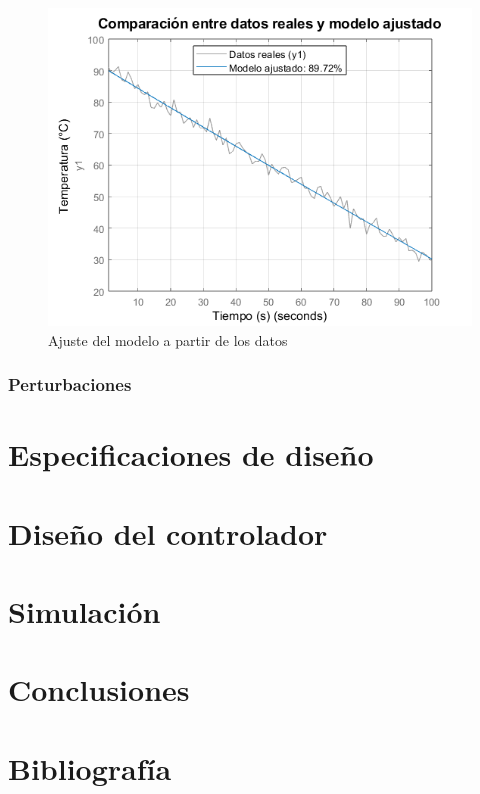 \documentclass[12pt]{article}
\begin{document}
	\begin{figure}[h!]
		\caption[Ajuste del modelo a partir de los datos]{}
		\label{fig:ajustemodelo}
		\includegraphics[width=1\linewidth]{Imagenes/ajuste_modelo}
		\caption[Ajuste del modelo a partir de los datos]{Ajuste del modelo a partir de los datos}
	\end{figure}\newpage
	
	\subsubsection{Perturbaciones}
	
		
		
	
\section{Especificaciones de diseño}

	
\section{Diseño del controlador}
\section{Simulación}
\section{Conclusiones}
\section{Bibliografía}
\end{document}
